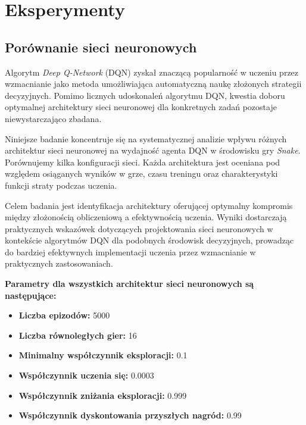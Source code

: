 \documentclass[a4paper,12pt]{article}
\begin{document}
\clearpage
  \section{Eksperymenty}

\subsection{Porównanie sieci neuronowych}

Algorytm \emph{Deep Q-Network} (DQN) zyskał znaczącą popularność w uczeniu przez wzmacnianie jako metoda umożliwiająca automatyczną naukę złożonych strategii decyzyjnych. Pomimo licznych udoskonaleń algorytmu DQN, kwestia doboru optymalnej architektury sieci neuronowej dla konkretnych zadań pozostaje niewystarczająco zbadana.

Niniejsze badanie koncentruje się na systematycznej analizie wpływu różnych architektur sieci neuronowej na wydajność agenta DQN w środowisku gry \emph{Snake}. Porównujemy kilka konfiguracji sieci. Każda architektura jest oceniana pod względem osiąganych wyników w grze, czasu treningu oraz charakterystyki funkcji straty podczas uczenia.


Celem badania jest identyfikacja architektury oferującej optymalny kompromis między złożonością obliczeniową a efektywnością uczenia. Wyniki dostarczają praktycznych wskazówek dotyczących projektowania sieci neuronowych w kontekście algorytmów DQN dla podobnych środowisk decyzyjnych, prowadząc do bardziej efektywnych implementacji uczenia przez wzmacnianie w praktycznych zastosowaniach.


\textbf{Parametry dla wszystkich architektur sieci neuronowych są następujące:}
\begin{itemize}
    \item \textbf{Liczba epizodów:} 5000
    \item \textbf{Liczba równoległych gier:} 16
    \item \textbf{Minimalny współczynnik eksploracji:} 0.1
    \item \textbf{Współczynnik uczenia się:} 0.0003
    \item \textbf{Współczynnik zniżania eksploracji:} 0.999
    \item  \textbf{Współczynnik dyskontowania przyszłych nagród:} 0.99
\end{itemize}
\end{document}
